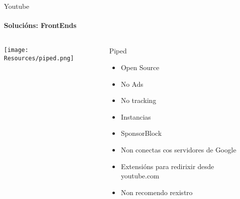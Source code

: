 \documentclass{beamer}
\begin{document}
\begin{frame}{Youtube}
  \framesubtitle{Solucións: FrontEnds}

  \begin{columns}
    \begin{column}{0.5\textwidth}
      \texttt{[image: Resources/piped.png]}

      \vspace{1cm}


    \end{column}

    \begin{column}{0.4\textwidth}
      \begin{block}{Piped}
        \begin{itemize}
          \item Open Source
          \item No Ads
          \item No tracking
          \item Instancias
          \item SponsorBlock
          \item Non conectas cos servidores de Google
          \item Extensións para redirixir desde youtube.com
          \item Non recomendo rexistro
        \end{itemize}
      \end{block}

    \end{column}

  \end{columns}

\end{frame}

\end{document}
